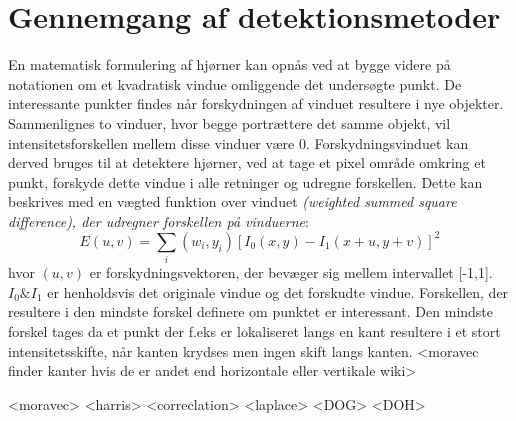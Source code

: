 \chapter{Gennemgang af detektionsmetoder} \label{sec:detmet}
En matematisk formulering af hjørner kan opnås ved at bygge videre på notationen om et kvadratisk vindue omliggende det undersøgte punkt. De interessante punkter findes når forskydningen af vinduet resultere i nye objekter. Sammenlignes to vinduer, hvor begge portrættere det samme objekt, vil intensitetsforskellen mellem disse vinduer være 0. Forskydningsvinduet kan derved bruges til at detektere hjørner, ved at tage et pixel område omkring et punkt, forskyde dette vindue i alle retninger og udregne forskellen. Dette kan beskrives med en vægted funktion over vinduet \emph{(weighted summed square difference), der udregner forskellen på vinduerne}:
\begin{equation}
E(u,v)= \sum\limits_{i}(w_i,y_i)[I_0(x,y)-I_1(x+u,y+v)]^2     
\end{equation}
hvor $(u,v)$ er forskydningsvektoren, der bevæger sig mellem intervallet [-1,1]. $I_0 \& I_1 $ er henholdsvis det originale vindue og det forskudte vindue. Forskellen, der resultere i den mindste forskel definere om punktet er interessant. Den mindste forskel tages da et punkt der f.eks er lokaliseret langs en kant resultere i et stort intensitetsskifte, når kanten krydses men ingen skift langs kanten. <moravec finder kanter hvis de er andet end horizontale eller vertikale wiki>

<moravec> <harris> <correclation> <laplace> <DOG> <DOH>